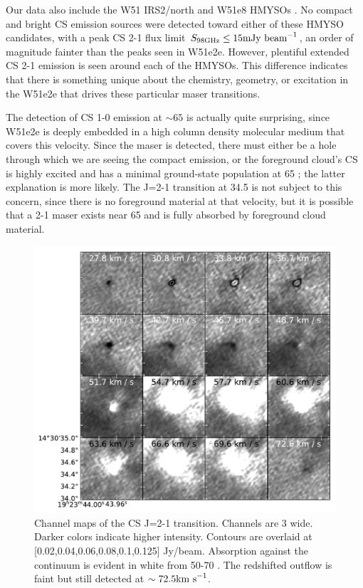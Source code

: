 \documentclass[twocolumn]{aastex62}
\begin{document}
Our data also include the W51 IRS2/north and W51e8 HMYSOs
\citep{Ginsburg2017a}.  No compact and bright CS emission sources were detected
toward either of these HMYSO candidates, with a peak CS 2-1 flux limit ${S_{98
\mathrm{GHz}} \leq 15 \mathrm{mJy~\textrm{beam}^{-1}}}$, an order of magnitude fainter
than the peaks seen in W51e2e.  However, plentiful extended CS 2-1 emission is
seen around each of the HMYSOs.  This difference indicates that there is
something unique about the chemistry, geometry, or excitation in the W51e2e
that drives these particular maser transitions.

The detection of CS 1-0 emission at $\sim65$ \kms is actually quite surprising,
since W51e2e is deeply embedded in a high column density molecular medium that
covers this velocity.  Since the maser is detected, there must either be a hole
through which we are seeing the compact emission, or the foreground cloud's CS
is highly excited and has a minimal ground-state population at 65 \kms; the
latter explanation is more likely.  The J=2-1 transition at 34.5 \kms is not
subject to this concern, since there is no foreground material at that
velocity, but it is possible that a 2-1 maser exists near 65 \kms and is fully
absorbed by foreground cloud material.


\begin{figure}
    \includegraphics[]{figures/CS_maser_channel_maps.pdf}
    \caption{Channel maps of the CS J=2-1 transition.  Channels are 3 \kms
    wide.  Darker colors indicate higher intensity.  Contours are overlaid at
    [0.02,0.04,0.06,0.08,0.1,0.125] Jy/beam.  Absorption against the continuum
    is evident in white from 50-70 \kms.  The redshifted outflow is faint but still
    detected at
    $\sim72.5\textrm{km~s}^{-1}$.
    }
    \label{fig:channelmaps}
\end{figure}
\end{document}
